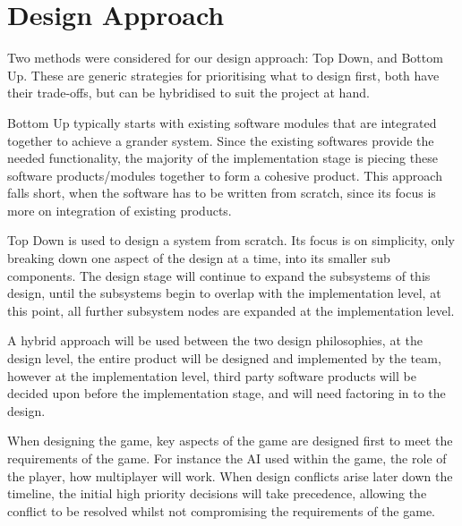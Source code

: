 \section{Design Approach}


Two methods were considered for our design approach: Top Down, and Bottom Up.
These are generic strategies for prioritising what to design first, both have their trade-offs, but can be hybridised to suit the project at hand.

Bottom Up typically starts with existing software modules that are integrated together to achieve a grander system.\cite{kautz1994bottom}
Since the existing softwares provide the needed functionality, the majority of the implementation stage is piecing these software products/modules together to form a cohesive product.
This approach falls short, when the software has to be written from scratch, since its focus is more on integration of existing products.

Top Down is used to design a system from scratch.
Its focus is on simplicity, only breaking down one aspect of the design at a time, into its smaller sub components.\cite{booch1982object}\cite{de1991object}
The design stage will continue to expand the subsystems of this design, until the subsystems begin to overlap with the implementation level, at this point, all further subsystem nodes are expanded at the implementation level.

A hybrid approach will be used between the two design philosophies, at the design level, the  entire product will be designed and implemented by the team, however at the implementation level, third party software products will be decided upon before the implementation stage, and will need factoring in to the design.

When designing the game, key aspects of the game are designed first to meet the requirements of the game. For instance the AI used within the game, the role of the player, how multiplayer will work.
When design conflicts arise later down the timeline, the initial high priority decisions will take precedence, allowing the conflict to be resolved whilst not compromising the requirements of the game.




